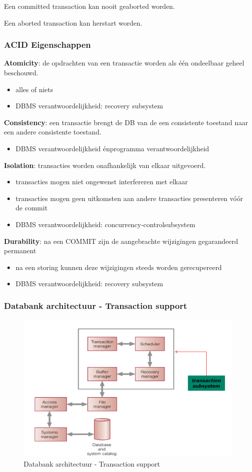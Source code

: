 \documentclass[a4paper,12pt]{article}
\begin{document}
Een committed transaction kan nooit geaborted worden.

Een aborted transaction kan herstart worden.

\subsubsection{ACID Eigenschappen}
\textbf{Atomicity}: de opdrachten van een transactie worden als één ondeelbaar geheel beschouwd.
\begin{itemize}
\item alles of niets
\item DBMS verantwoordelijkheid: recovery subsystem
\end{itemize}

\textbf{Consistency}: een transactie brengt de DB van de een consistente toestand naar een andere consistente toestand.
\begin{itemize}
\item DBMS verantwoordelijkheid énprogramma verantwoordelijkheid
\end{itemize}

\textbf{Isolation}: transacties worden onafhankelijk van elkaar uitgevoerd.
\begin{itemize}
\item transacties mogen niet ongewenst interfereren met elkaar
\item transacties mogen geen uitkomsten aan andere transacties presenteren vóór de commit
\item DBMS verantwoordelijkheid: concurrency-controlsubsystem
\end{itemize}

\textbf{Durability}: na een COMMIT zijn de aangebrachte wijzigingen gegarandeerd permanent
\begin{itemize}
\item na een storing kunnen deze wijzigingen steeds worden gerecupereerd
\item DBMS verantwoordelijkheid: recovery subsystem
\end{itemize}

\subsubsection{Databank architectuur - Transaction support}
\begin{figure}[H]
\centering
  	\includegraphics[width=.65\linewidth]{img/databankArchitectuur.png}
  	\caption{Databank architectuur - Transaction support}
  	\label{fig:DatabankArchitectuur}
\end{figure}
\end{document}
